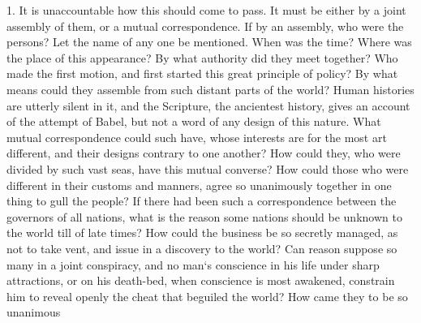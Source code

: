 \documentclass[a5paper]{book}
\begin{document}
1. It is unaccountable how this should come to pass. It must be
either by a joint assembly of them, or a mutual correspondence. If
by an assembly, who were the persons? Let the name of any one
be mentioned. When was the time? Where was the place of this
appearance? By what authority did they meet together? Who
made the first motion, and first started this great principle of policy?
By what means could they assemble from such distant parts of the
world? Human histories are utterly silent in it, and the Scripture,
the ancientest history, gives an account of the attempt of Babel, but
not a word of any design of this nature. What mutual correspondence 
could such have, whose interests are for the most art different, 
and their designs contrary to one another? How could they, who
were divided by such vast seas, have this mutual converse? How
could those who were different in their customs and manners, agree
so unanimously together in one thing to gull the people? If there
had been such a correspondence between the governors of all nations,
what is the reason some nations should be unknown to the world
till of late times? How could the business be so secretly managed,
as not to take vent, and issue in a discovery to the world? Can
reason suppose so many in a joint conspiracy, and no man`s 
conscience in his life under sharp attractions, or on his death-bed, when
conscience is most awakened, constrain him to reveal openly the
cheat that beguiled the world? How came they to be so unanimous
\end{document}
